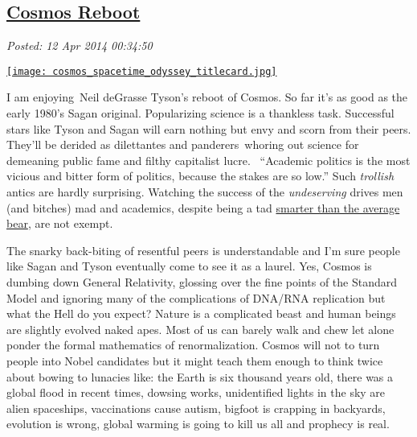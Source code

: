 %

\subsection*{\href{https://bakerjd99.wordpress.com/2014/04/11/cosmos-reboot/}{Cosmos Reboot}}


\noindent\emph{Posted: 12 Apr 2014 00:34:50}
\vspace{6pt}

\captionsetup[floatingfigure]{labelformat=empty}
\begin{floatingfigure}[l]{0.25\textwidth}
\centering
\href{http://www.cosmosontv.com/}{\texttt{[image: cosmos\_spacetime\_odyssey\_titlecard.jpg]}}
\label{fig:4624X0}
\end{floatingfigure}I am enjoying~Neil deGrasse Tyson's reboot of Cosmos. So far it's as good
as the early 1980's Sagan original. Popularizing science is a thankless
task. Successful stars like Tyson and Sagan will earn nothing but envy
and scorn from their peers. They'll be derided as dilettantes and
panderers~whoring out science for demeaning public fame and filthy
capitalist lucre. ~``Academic politics is the most vicious and bitter
form of politics, because the stakes are so low.'' Such \emph{trollish}
antics are hardly surprising. Watching the success of the
\emph{undeserving} drives men (and bitches) mad and academics, despite
being a tad \href{https://www.youtube.com/watch?v=1pqyax6gwzQ}{smarter
than the average bear}, are not exempt.

The snarky back-biting of resentful peers is understandable and I'm sure
people like Sagan and Tyson eventually come to see it as a laurel. Yes,
Cosmos is dumbing down General Relativity, glossing over the fine points
of the Standard Model and ignoring many of the complications of DNA/RNA
replication but what the Hell do you expect? Nature is a complicated
beast and human beings are slightly evolved naked apes. Most of us can
barely walk and chew let alone ponder the formal mathematics of
renormalization. Cosmos will not to turn people into Nobel candidates
but it might teach them enough to think twice about bowing to lunacies
like: the Earth is six thousand years old, there was a global flood in
recent times, dowsing works, unidentified lights in the sky are alien
spaceships, vaccinations cause autism, bigfoot is crapping in backyards,
evolution is wrong, global warming is going to kill us all and prophecy
is real.

